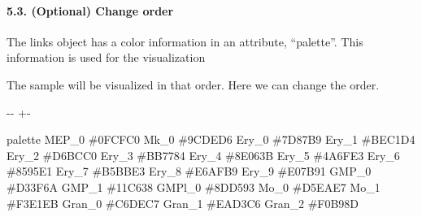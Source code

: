 \documentclass[letterpaper,10pt,english]{sphinxmanual}
\newlength\nbsphinxcodecellspacing
\begin{document}
\paragraph{5.3. (Optional) Change order}
\label{\detokenize{notebooks/04_Network_analysis/Network_analysis_with_Paul_etal_2015_data:5.3.-(Optional)-Change-order}}
The links object has a color information in an attribute, “palette”. This information is used for the visualization

The sample will be visualized in that order. Here we can change the order.

{
\begin{sphinxVerbatim}[commandchars=\\\{\}]
\llap{\color{nbsphinxin}[75]:\,\hspace{\fboxrule}\hspace{\fboxsep}}
\end{sphinxVerbatim}
}

{

\kern-\sphinxverbatimsmallskipamount\kern-\baselineskip
\kern+\FrameHeightAdjust\kern-\fboxrule
\vspace{\nbsphinxcodecellspacing}

\begin{sphinxVerbatim}[commandchars=\\\{\}]
\llap{\color{nbsphinxout}[75]:\,\hspace{\fboxrule}\hspace{\fboxsep}}        palette
MEP\_0   \#0FCFC0
Mk\_0    \#9CDED6
Ery\_0   \#7D87B9
Ery\_1   \#BEC1D4
Ery\_2   \#D6BCC0
Ery\_3   \#BB7784
Ery\_4   \#8E063B
Ery\_5   \#4A6FE3
Ery\_6   \#8595E1
Ery\_7   \#B5BBE3
Ery\_8   \#E6AFB9
Ery\_9   \#E07B91
GMP\_0   \#D33F6A
GMP\_1   \#11C638
GMPl\_0  \#8DD593
Mo\_0    \#D5EAE7
Mo\_1    \#F3E1EB
Gran\_0  \#C6DEC7
Gran\_1  \#EAD3C6
Gran\_2  \#F0B98D
\end{sphinxVerbatim}
}
\end{document}
